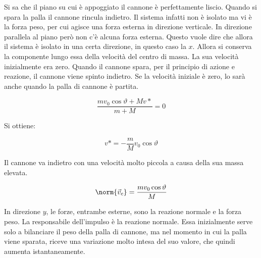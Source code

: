 \begin{figure}[htpb]
\end{figure}
\FloatBarrier
Si sa che il piano su cui è appoggiato il cannone è perfettamente liscio. Quando si spara la palla il cannone rincula indietro. Il sistema infatti non è isolato ma vi è la forza peso, per cui agisce una forza esterna in direzione verticale. In direzione parallela al piano però non c'è alcuna forza esterna. Questo vuole dire che allora il sistema è isolato in una certa direzione, in questo caso la $x$. Allora si conserva la componente lungo essa della velocità del centro di massa. La sua velocità inizialmente era zero. Quando il cannone spara, per il principio di azione e reazione, il cannone viene spinto indietro. Se la velocità iniziale è zero, lo sarà anche quando la palla di cannone è partita.

\[
	\frac{mv_0 \cos\vartheta+ Mv*}{m+M} =0
\]

Si ottiene:

\[
	v*=-\frac{m}{M}v_0\cos\vartheta
\]

Il cannone va indietro con una velocità molto piccola a causa della sua massa elevata.

\[
	\norm{\vec{v}_c}=\frac{mv_0\cos\vartheta}{M}
\]

In direzione $y$, le forze, entrambe esterne, sono la reazione normale e la forza peso. La responsabile dell'impulso è la reazione normale. Essa inizialmente serve solo a bilanciare il peso della palla di cannone, ma nel momento in cui la palla viene sparata, riceve una variazione molto intesa del suo valore, che quindi aumenta istantaneamente.

